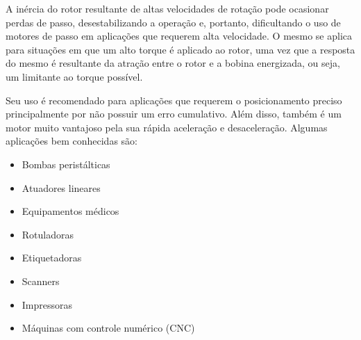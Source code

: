 A inércia do rotor resultante de altas velocidades de rotação pode ocasionar perdas de passo, desestabilizando a operação e, portanto, dificultando o uso de motores de passo em aplicações que requerem alta velocidade. O mesmo se aplica para situações em que um alto torque é aplicado ao rotor, uma vez que a resposta do mesmo é resultante da atração entre o rotor e a bobina energizada, ou seja, um limitante ao torque possível.

Seu uso é recomendado para aplicações que requerem o posicionamento preciso principalmente por não possuir um erro cumulativo. Além disso, também é um motor muito vantajoso pela sua rápida aceleração e desaceleração. Algumas aplicações bem conhecidas são:
\begin{itemize}
\item Bombas peristálticas
\item Atuadores lineares
\item Equipamentos médicos
\item Rotuladoras
\item Etiquetadoras 
\item Scanners
\item Impressoras 
\item Máquinas com controle numérico (CNC)
\end{itemize}


